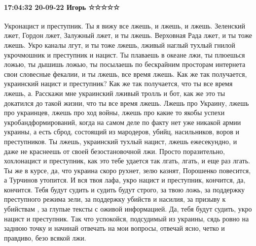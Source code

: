  
 
 
 
 

\paragraph{17:04:32 20-09-22 Игорь ☆☆☆☆☆}

Укронацист и преступник. Ты я вижу все лжешь, и лжешь, и лжешь. Зеленский лжет,
Гордон лжет, Залужный лжет, и ты лжешь. Верховная Рада лжет, и ты
тоже лжешь. Укро каналы лгут, и ты тоже лжешь, лживый наглый
тухлый гнилой укрочмошник и преступник и нацист. Ты плаваешь в океане лжи, ты
плюешься ложью, ты дышишь ложью, ты посылаешь по бескрайним просторам
интернета свои словесные фекалии, и ты лжешь, все время лжешь. Как же так
получается, украинский нацист и преступник? Как же так получается, что ты все
время лжешь, а. Расскажи мне украинский лживый тролль и бот, как же это ты
докатился до такой жизни, что ты все время лжешь. Лжешь про Украину, лжешь про
украинцев, лжешь про ход войны, лжешь про какие то якобы успехи укробандформирований, когда на самом деле по факту нет уже никакой армии украины, а есть сброд,
состоящий из мародеров, убийц, насильников, воров и преступников. Ты лжешь,
украинский тухлый нацист, лжешь ежесекундно, и даже не краснеешь от своей
безостановочной лжи. Просто поразительно, хохлонацист и преступник,
как это тебе удается так лгать, лгать, и еще раз лгать. Ты же в курсе, да, что
украина скоро рухнет, зелю казнят, Порошенко повесится, а Турчинов утопится. И вся
твоя лафа, укро нацист и преступник, кончится, да, кончится. Тебя будут
судить и судить будут строго, за твою ложь, за поддержку преступного режима
зели, за поддержку убийств и насилия, за призыву к убийствам , за
глупые тексты с оживой информацией. Да, тебя будут судить, укро
нацист и преступник. Так что успокойся, подсудимый из украины, сядь ровно на заднюю точку и
начинай отвечать на мои вопросы, отвечай ясно, четко и правдиво, безо всякой лжи.
